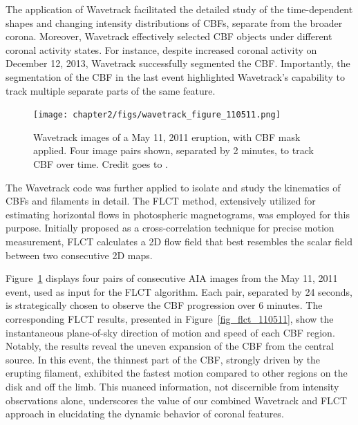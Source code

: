 The application of Wavetrack facilitated the detailed study of the time-dependent shapes and changing intensity distributions of CBFs, separate from the broader corona. Moreover, Wavetrack effectively selected CBF objects under different coronal activity states. For instance, despite increased coronal activity on December 12, 2013, Wavetrack successfully segmented the CBF. Importantly, the segmentation of the CBF in the last event highlighted Wavetrack's capability to track multiple separate parts of the same feature.

\begin{figure}[!htp]
	\centering
	\texttt{[image: chapter2/figs/wavetrack\_figure\_110511.png]}
	\caption{Wavetrack images of a May 11, 2011 eruption, with CBF mask applied. Four image pairs shown, separated by 2 minutes, to track CBF over time. Credit goes to \citet{stepanyuk_2022}.}
	\label{fig_wavetrack_cbf_center}
\end{figure}

The Wavetrack code was further applied to isolate and study the kinematics of CBFs and filaments in detail. The FLCT method, extensively utilized for estimating horizontal flows in photospheric magnetograms, was employed for this purpose. Initially proposed as a cross-correlation technique for precise motion measurement, FLCT calculates a 2D flow field that best resembles the scalar field between two consecutive 2D maps.

Figure~\ref{fig_wavetrack_cbf_center} displays four pairs of consecutive AIA images from the May 11, 2011 event, used as input for the FLCT algorithm. Each pair, separated by 24 seconds, is strategically chosen to observe the CBF progression over 6 minutes. The corresponding FLCT results, presented in Figure~\ref{fig_flct_110511}, show the instantaneous plane-of-sky direction of motion and speed of each CBF region. Notably, the results reveal the uneven expansion of the CBF from the central source. In this event, the thinnest part of the CBF, strongly driven by the erupting filament, exhibited the fastest motion compared to other regions on the disk and off the limb. This nuanced information, not discernible from intensity observations alone, underscores the value of our combined Wavetrack and FLCT approach in elucidating the dynamic behavior of coronal features.

